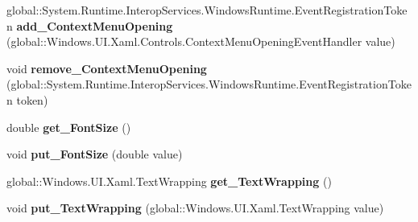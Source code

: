 \begin{DoxyCompactItemize}
\item 
\mbox{\label{interface_windows_1_1_u_i_1_1_xaml_1_1_controls_1_1_i_text_block_a1d8100da7fff6292db5c7e88860bb898}} 
global\+::\+System.\+Runtime.\+Interop\+Services.\+Windows\+Runtime.\+Event\+Registration\+Token {\bfseries add\+\_\+\+Context\+Menu\+Opening} (global\+::\+Windows.\+U\+I.\+Xaml.\+Controls.\+Context\+Menu\+Opening\+Event\+Handler value)
\item 
\mbox{\label{interface_windows_1_1_u_i_1_1_xaml_1_1_controls_1_1_i_text_block_a68593635321b0b8cd439a3d341f86485}} 
void {\bfseries remove\+\_\+\+Context\+Menu\+Opening} (global\+::\+System.\+Runtime.\+Interop\+Services.\+Windows\+Runtime.\+Event\+Registration\+Token token)
\item 
\mbox{\label{interface_windows_1_1_u_i_1_1_xaml_1_1_controls_1_1_i_text_block_a9912fea3536da888623b2947225a9d6d}} 
double {\bfseries get\+\_\+\+Font\+Size} ()
\item 
\mbox{\label{interface_windows_1_1_u_i_1_1_xaml_1_1_controls_1_1_i_text_block_a6bee3c5a6d60cdfb17958f446638701f}} 
void {\bfseries put\+\_\+\+Font\+Size} (double value)
\item 
\mbox{\label{interface_windows_1_1_u_i_1_1_xaml_1_1_controls_1_1_i_text_block_a912cc8618a3b0c565221ad7580825895}} 
global\+::\+Windows.\+U\+I.\+Xaml.\+Text\+Wrapping {\bfseries get\+\_\+\+Text\+Wrapping} ()
\item 
\mbox{\label{interface_windows_1_1_u_i_1_1_xaml_1_1_controls_1_1_i_text_block_a8b3ae1457755d87019558339b825f1df}} 
void {\bfseries put\+\_\+\+Text\+Wrapping} (global\+::\+Windows.\+U\+I.\+Xaml.\+Text\+Wrapping value)
\item 
\mbox{\label{interface_windows_1_1_u_i_1_1_xaml_1_1_controls_1_1_i_text_block_a830e1b11e0ae1ce7d5dfcacbb0034c62}} 

\end{DoxyCompactItemize}
